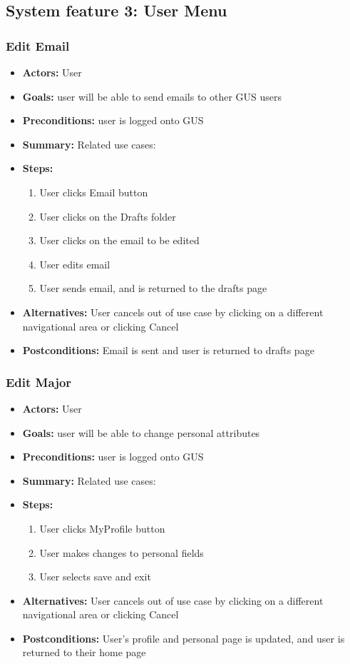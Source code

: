 		\subsection{System feature 3: User Menu}
         \subsubsection{Edit Email}
			\begin{itemize}
				\item{\textbf{Actors:} User}
				\item{\textbf{Goals:} user will be able to send emails to other GUS users}
				\item{\textbf{Preconditions:} user is logged onto GUS}
				\item{\textbf{Summary:} Related use cases: }
				\item{\textbf{Steps:}
				\begin{enumerate}
					\item{User clicks Email button}
					\item{User clicks on the Drafts folder}
					\item{User clicks on the email to be edited}
					\item{User edits email}
					\item{User sends email, and is returned to the drafts page}
				\end{enumerate}
				}
				\item{\textbf{Alternatives:} User cancels out of use case by clicking on a different navigational area or clicking Cancel}
				\item{\textbf{Postconditions:} Email is sent and user is returned to drafts page}
			\end{itemize}
         \subsubsection{Edit Major}
			\begin{itemize}
				\item{\textbf{Actors:} User}
				\item{\textbf{Goals:} user will be able to change personal attributes}
				\item{\textbf{Preconditions:} user is logged onto GUS}
				\item{\textbf{Summary:} Related use cases: }
				\item{\textbf{Steps:}
				\begin{enumerate}
					\item{User clicks MyProfile button}
					\item{User makes changes to personal fields}
					\item{User selects save and exit}
				\end{enumerate}
				}
				\item{\textbf{Alternatives:} User cancels out of use case by clicking on a different navigational area or clicking Cancel}
				\item{\textbf{Postconditions:} User's profile and personal page is updated, and user is returned to their home page}
			\end{itemize}

